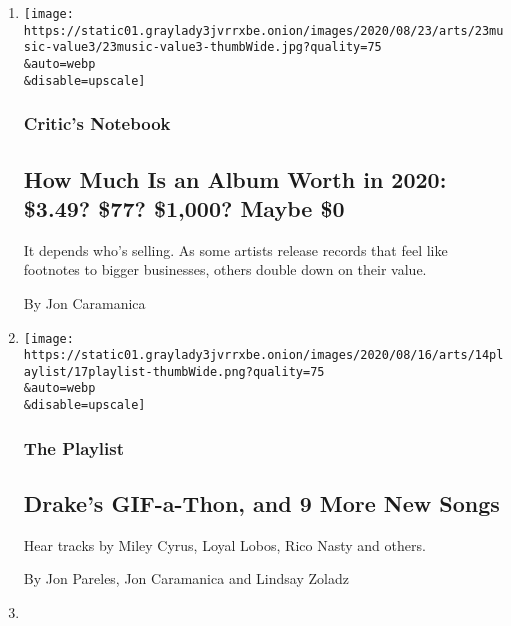 \begin{enumerate}
\def\labelenumi{\arabic{enumi}.}
\item
  \href{/2020/08/19/arts/music/albums-price.html}{}

  \texttt{[image: https://static01.graylady3jvrrxbe.onion/images/2020/08/23/arts/23music-value3/23music-value3-thumbWide.jpg?quality=75\\\&auto=webp\\\&disable=upscale]}

  \hypertarget{critics-notebook}{%
  \subsubsection{Critic's Notebook}\label{critics-notebook}}

  \hypertarget{how-much-is-an-album-worth-in-2020-349-77-1000-maybe-0}{%
  \subsection{How Much Is an Album Worth in 2020: \$3.49? \$77? \$1,000?
  Maybe
  \$0}\label{how-much-is-an-album-worth-in-2020-349-77-1000-maybe-0}}

  It depends who's selling. As some artists release records that feel
  like footnotes to bigger businesses, others double down on their
  value.

  By Jon Caramanica
\item
  \href{/2020/08/14/arts/music/playlist-drake-miley-cyrus.html}{}

  \texttt{[image: https://static01.graylady3jvrrxbe.onion/images/2020/08/16/arts/14playlist/17playlist-thumbWide.png?quality=75\\\&auto=webp\\\&disable=upscale]}

  \hypertarget{the-playlist}{%
  \subsubsection{The Playlist}\label{the-playlist}}

  \hypertarget{drakes-gif-a-thon-and-9-more-new-songs}{%
  \subsection{Drake's GIF-a-Thon, and 9 More New
  Songs}\label{drakes-gif-a-thon-and-9-more-new-songs}}

  Hear tracks by Miley Cyrus, Loyal Lobos, Rico Nasty and others.

  By Jon Pareles, Jon Caramanica and Lindsay Zoladz
\item
  \href{/2020/08/13/movies/martin-margiela-in-his-own-words-review.html}{}


\end{enumerate}
